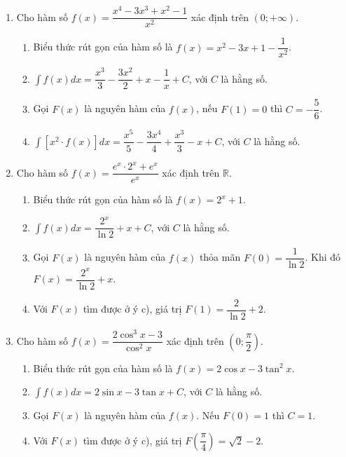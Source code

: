 \documentclass[12pt]{article}
\begin{document}
\begin{enumerate}[label=\textbf{Câu \arabic*.}, start=1]
		\item Cho hàm số $f(x) = \dfrac{x^4 - 3x^3 + x^2 - 1}{x^2}$ xác định trên $(0; +\infty)$.
		\begin{enumerate}[label=\alph*)]
			\item Biểu thức rút gọn của hàm số là $f(x) = x^2 - 3x + 1 - \dfrac{1}{x^2}$.
			\item $\displaystyle \int f(x) dx = \dfrac{x^3}{3} - \dfrac{3x^2}{2} + x - \dfrac{1}{x} + C$, với $C$ là hằng số.
			\item Gọi $F(x)$ là nguyên hàm của $f(x)$, nếu $F(1) = 0$ thì $C = -\dfrac{5}{6}$.
			\item $\displaystyle \int [x^2 \cdot f(x)] dx = \dfrac{x^5}{5} - \dfrac{3x^4}{4} + \dfrac{x^3}{3} - x + C$, với $C$ là hằng số.
		\end{enumerate}
		
		\item Cho hàm số $f(x) = \dfrac{e^x \cdot 2^x + e^x}{e^x}$ xác định trên $\mathbb{R}$.
		\begin{enumerate}[label=\alph*)]
			\item Biểu thức rút gọn của hàm số là $f(x) = 2^x + 1$.
			\item $\displaystyle \int f(x) dx = \dfrac{2^x}{\ln 2} + x + C$, với $C$ là hằng số.
			\item Gọi $F(x)$ là nguyên hàm của $f(x)$ thỏa mãn $F(0) = \dfrac{1}{\ln 2}$. Khi đó $F(x) = \dfrac{2^x}{\ln 2} + x$.
			\item Với $F(x)$ tìm được ở ý c), giá trị $F(1) = \dfrac{2}{\ln 2} + 2$.
		\end{enumerate}
		
		\item Cho hàm số $f(x) = \dfrac{2\cos^3 x - 3}{\cos^2 x}$ xác định trên $\left(0; \dfrac{\pi}{2}\right)$.
		\begin{enumerate}[label=\alph*)]
			\item Biểu thức rút gọn của hàm số là $f(x) = 2\cos x - 3\tan^2 x$.
			\item $\displaystyle \int f(x) dx = 2\sin x - 3\tan x + C$, với $C$ là hằng số.
			\item Gọi $F(x)$ là nguyên hàm của $f(x)$. Nếu $F(0) = 1$ thì $C = 1$.
			\item Với $F(x)$ tìm được ở ý c), giá trị $F\left(\dfrac{\pi}{4}\right) = \sqrt{2} - 2$.
		\end{enumerate}
		

\end{enumerate}
\end{document}
